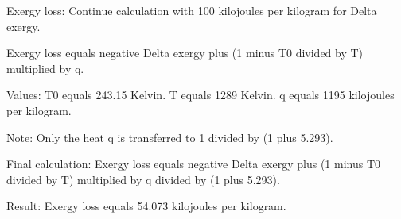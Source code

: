 Exergy loss: Continue calculation with 100 kilojoules per kilogram for Delta exergy.  

Exergy loss equals negative Delta exergy plus (1 minus T0 divided by T) multiplied by q.  

Values:  
T0 equals 243.15 Kelvin.  
T equals 1289 Kelvin.  
q equals 1195 kilojoules per kilogram.  

Note: Only the heat q is transferred to 1 divided by (1 plus 5.293).  

Final calculation:  
Exergy loss equals negative Delta exergy plus (1 minus T0 divided by T) multiplied by q divided by (1 plus 5.293).  

Result:  
Exergy loss equals 54.073 kilojoules per kilogram.